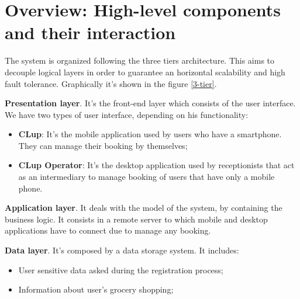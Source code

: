 \section{Overview: High-level components and their interaction}
The system is organized following the three tiers architecture. This aims to decouple logical layers in order to guarantee an horizontal scalability and high fault tolerance.
Graphically it's shown in the figure \ref{3-tier}.
\par

\textbf{Presentation layer}. It's the front-end layer which consists of the user interface. We have two types of user interface, depending on his functionality: 
\begin{itemize}
\item \textbf{CLup}: It's the mobile application used by users who have a smartphone. They can manage their booking by themselves;
\item \textbf{CLup Operator}: It's the desktop application used by receptionists that act as an intermediary to manage booking of users that have only a mobile phone.
\end{itemize}

\textbf{Application layer}. It deals with the model of the system, by containing the business logic. It consists in a remote server to which mobile and desktop applications have to connect due to manage any booking.

\textbf{Data layer}. It's composed by a data storage system. It includes: 


\begin{itemize}
\item User sensitive data asked during the registration process;
\item Information about user's grocery shopping;
\end{itemize}

